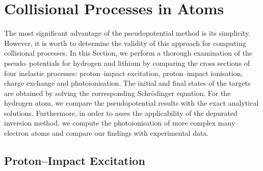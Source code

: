 \documentclass[10pt]{article}
\begin{document}
\section{Collisional Processes in Atoms}
\label{sec:colproc}

The most significant advantage of the pseudopotential method is 
its simplicity. However, it is worth to determine the validity
of this approach for computing collisional processes.
In this Section, we perform a thorough examination of the
pseudo--potentials for hydrogen and 
lithium by comparing the cross sections of four inelastic 
processes: proton--impact excitation, proton--impact ionisation,
charge exchange and photoionisation. The initial and final states
of the targets are obtained by solving the corresponding Schr\"odinger 
equation.
For the hydrogen atom, we compare the pseudopotential results with 
the exact analytical solutions.  
Furthermore, in order to asses the applicability of the 
depurated inversion method, we compute the photoionisation of 
more complex many--electron atoms and 
compare our findings with experimental data.


\subsection{Proton--Impact Excitation}
\end{document}
